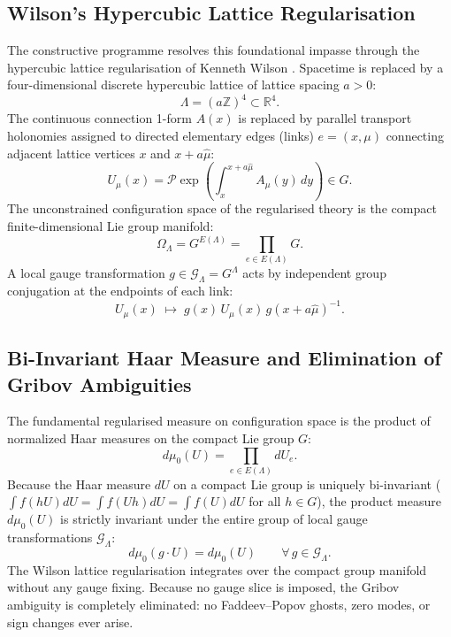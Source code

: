 \subsection{Wilson's Hypercubic Lattice Regularisation}
\label{subsec:wilson_lattice_intro}
The constructive programme resolves this foundational impasse through the hypercubic lattice regularisation of Kenneth Wilson \cite{Wilson1974}. Spacetime is replaced by a four-dimensional discrete hypercubic lattice of lattice spacing $a > 0$:
\begin{equation}
\Lambda = (a \mathbb{Z})^4 \subset \mathbb{R}^4.
\end{equation}
The continuous connection 1-form $A(x)$ is replaced by parallel transport holonomies assigned to directed elementary edges (links) $e = (x, \mu)$ connecting adjacent lattice vertices $x$ and $x + a\hat{\mu}$:
\begin{equation}
U_\mu(x) = \mathcal{P} \exp\left( \int_x^{x + a\hat{\mu}} A_\mu(y) \, dy \right) \in G.
\end{equation}
The unconstrained configuration space of the regularised theory is the compact finite-dimensional Lie group manifold:
\begin{equation}
\Omega_\Lambda = G^{E(\Lambda)} = \prod_{e \in E(\Lambda)} G.
\end{equation}
A local gauge transformation $g \in \mathcal{G}_\Lambda = G^\Lambda$ acts by independent group conjugation at the endpoints of each link:
\begin{equation}
U_\mu(x) \;\mapsto\; g(x) \, U_\mu(x) \, g(x + a\hat{\mu})^{-1}.
\end{equation}

\subsection{Bi-Invariant Haar Measure and Elimination of Gribov Ambiguities}
\label{subsec:haar_measure_elimination}
The fundamental regularised measure on configuration space is the product of normalized Haar measures on the compact Lie group $G$:
\begin{equation}
d\mu_0(U) = \prod_{e \in E(\Lambda)} dU_e.
\end{equation}
Because the Haar measure $dU$ on a compact Lie group is uniquely bi-invariant ($\int f(h U) dU = \int f(U h) dU = \int f(U) dU$ for all $h \in G$), the product measure $d\mu_0(U)$ is strictly invariant under the entire group of local gauge transformations $\mathcal{G}_\Lambda$:
\begin{equation}
d\mu_0(g \cdot U) = d\mu_0(U) \qquad \forall \, g \in \mathcal{G}_\Lambda.
\end{equation}
The Wilson lattice regularisation integrates over the compact group manifold without any gauge fixing. Because no gauge slice is imposed, the Gribov ambiguity is completely eliminated: no Faddeev--Popov ghosts, zero modes, or sign changes ever arise.


